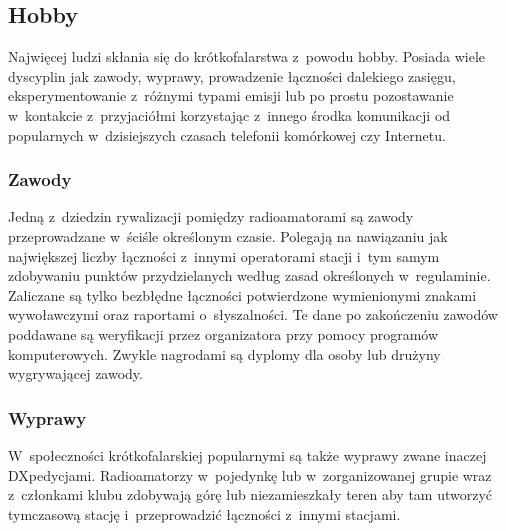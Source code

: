 \documentclass[eng,oneside]{mgr}
\begin{document}
			\subsection{Hobby}
			Najwięcej ludzi skłania się do krótkofalarstwa z~powodu hobby. Posiada wiele dyscyplin jak zawody, wyprawy, prowadzenie łączności dalekiego zasięgu, eksperymentowanie z~różnymi typami emisji lub po prostu pozostawanie w~kontakcie z~przyjaciółmi korzystając z~innego środka komunikacji od popularnych w~dzisiejszych czasach telefonii komórkowej czy Internetu.

				\subsubsection{Zawody}
				Jedną z~dziedzin rywalizacji pomiędzy radioamatorami są zawody przeprowadzane w~ściśle określonym czasie. Polegają na nawiązaniu jak największej liczby łączności z~innymi operatorami stacji i~tym samym zdobywaniu punktów przydzielanych według zasad określonych w~regulaminie. Zaliczane są tylko bezbłędne łączności potwierdzone wymienionymi znakami wywoławczymi oraz raportami o~słyszalności. Te dane po zakończeniu zawodów poddawane są weryfikacji przez organizatora przy pomocy programów komputerowych. Zwykle nagrodami są dyplomy dla osoby lub drużyny wygrywającej zawody.

				\subsubsection{Wyprawy}
				W~społeczności krótkofalarskiej popularnymi są także wyprawy zwane inaczej DXpedycjami. Radioamatorzy w~pojedynkę lub w~zorganizowanej grupie wraz z~członkami klubu zdobywają górę lub niezamieszkały teren aby tam utworzyć tymczasową stację i~przeprowadzić łączności z~innymi stacjami.
\end{document}
